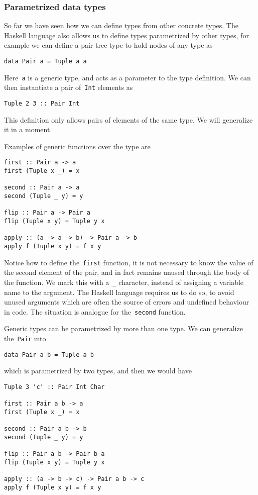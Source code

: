 \documentclass[../TFG.tex]{subfiles}
\begin{document}
\subsubsection{Parametrized data types}
So far we have seen how we can define types from other concrete types. The
Haskell language also allows us to define types parametrized by other types, for
example we can define a pair tree type to hold nodes of any type as
\begin{verbatim}
data Pair a = Tuple a a
\end{verbatim}

Here~\texttt{a} is a generic type, and acts as a parameter to the
type definition. We can then instantiate a pair
of~\texttt{Int} elements as
\begin{verbatim}
Tuple 2 3 :: Pair Int
\end{verbatim}
This definition only allows pairs of elements of the same type. We will
generalize it in a moment.

Examples of generic functions over the type are
\begin{verbatim}
first :: Pair a -> a
first (Tuple x _) = x

second :: Pair a -> a
second (Tuple _ y) = y

flip :: Pair a -> Pair a
flip (Tuple x y) = Tuple y x

apply :: (a -> a -> b) -> Pair a -> b
apply f (Tuple x y) = f x y
\end{verbatim}
Notice how to define the~\texttt{first} function, it is not
necessary to know the value of the second element of the pair, and in fact
remains unused through the body of the function. We mark this with
a~\texttt{_} character, instead of assigning a variable name to the
argument. The Haskell language requires us to do so, to avoid unused arguments
which are often the source of errors and undefined behaviour in code. The
situation is analogue for the~\texttt{second} function.

Generic types can be parametrized by more than one type. We can generalize
the~\texttt{Pair} into
\begin{verbatim}
data Pair a b = Tuple a b
\end{verbatim}
which is parametrized by two types, and then we would have
\begin{verbatim}
Tuple 3 'c' :: Pair Int Char

first :: Pair a b -> a
first (Tuple x _) = x

second :: Pair a b -> b
second (Tuple _ y) = y

flip :: Pair a b -> Pair b a
flip (Tuple x y) = Tuple y x

apply :: (a -> b -> c) -> Pair a b -> c
apply f (Tuple x y) = f x y
\end{verbatim}
\end{document}
